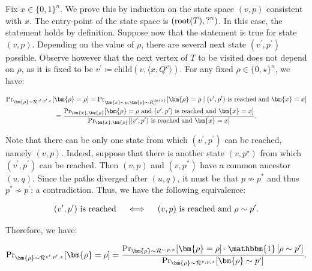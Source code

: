 Fix $x\in\{0,1\}^{n}$. We prove this by induction on the state space $(v,p)$ consistent with $x$. The entry-point of the state space is $(\textup{root}(T),\mathord{?}^{n})$. In this case, the statement holds by definition. Suppose now that the statement is true for state $(v,p)$. Depending on the value of $\rho$, there are several next state $(v^{\prime},p^{\prime})$ possible. Observe however that the next vertex of $T$ to be visited does not depend on $\rho$, as it is fixed to be $v^{\prime}\coloneqq\mathrm{child}(v,\langle x,Q^{v}\rangle)$. For any fixed $\rho\in\{0,\star\}^{n}$, we have:\par


\[\begin{gathered}
\displaystyle\Pr\nolimits_{\bm{\rho}\sim\mathcal{R}^{v^{\prime},p^{\prime},x}}[\bm{\rho}=\rho] \displaystyle=\Pr\nolimits_{\bm{x}\sim\mu,\bm{\rho}\sim R_{\mu}^{\bm{x}}}[\bm{\rho}=\rho\mid\textup{$(v^{\prime},p^{\prime})$ is reached and $\bm{x}=x$}] \\
\displaystyle=\frac{\Pr_{\bm{x},\bm{\rho}}[\textup{$\bm{\rho}=\rho$ and $(v^{\prime},p^{\prime})$ is reached and $\bm{x}=x$}]}{\Pr_{\bm{x},\bm{\rho}}[\textup{$(v^{\prime},p^{\prime})$ is reached and $\bm{x}=x$}]}.
\end{gathered}\]


Note that there can be only one state from which $(v^{\prime},p^{\prime})$ can be reached, namely $(v,p)$. Indeed, suppose that there is another state $(v,p^{\star})$ from which $(v^{\prime},p^{\prime})$ can be reached. Then $(v,p)$ and $(v,p^{*})$ have a common ancestor $(u,q)$. Since the paths diverged after $(u,q)$, it must be that $p\nsim p^{*}$ and thus $p^{*}\nsim p^{\prime}$: a contradiction. Thus, we have the following equivalence:\par


\[\begin{gathered}
\textup{$(v^{\prime},p^{\prime})$ is reached}\quad\iff\quad\textup{$(v,p)$ is reached and $\rho\sim p^{\prime}$}.
\end{gathered}\]


Therefore, we have:\par


\[\begin{gathered}
\Pr\nolimits_{\bm{\rho}\sim\mathcal{R}^{v^{\prime},p^{\prime},x}}[\bm{\rho}=\rho]=\frac{\Pr_{\bm{\rho}\sim\mathcal{R}^{v,p,x}}[\bm{\rho}=\rho]\cdot\mathbbm{1}\left[\rho\sim p^{\prime}\right]}{\Pr_{\bm{\rho}\sim\mathcal{R}^{v,p,x}}[\bm{\rho}\sim p^{\prime}]}.
\end{gathered}\]


